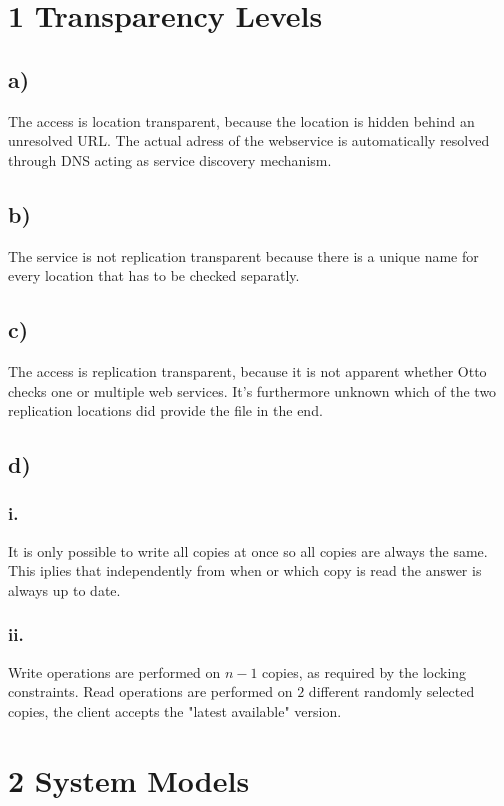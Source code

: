 \documentclass{scrartcl}
\author{Felix Bühler\\2973410 \and Clemens Lieb\\3130838 \and Steffen Wonner\\2862123 \and Fabian Bühler\\2953320}
\title{\gettitle}
\subtitle{\getsubtitle}
\begin{document}
\maketitle

\section*{1 Transparency Levels}
\subsection*{a)}
The access is location transparent, because the location is hidden behind an unresolved URL.
The actual adress of the webservice is automatically resolved through DNS acting as service discovery mechanism.
\subsection*{b)}
The service is not replication transparent because there is a unique name for every location that has to be checked separatly.
\subsection*{c)}
The access is replication transparent, because it is not apparent whether Otto checks one or multiple web services.
It's furthermore unknown which of the two replication locations did provide the file in the end.
\subsection*{d)}
\subsubsection*{i.}
It is only possible to write all copies at once so all copies are always the same.
This iplies that independently from when or which copy is read the answer is always up to date.
\subsubsection*{ii.}
Write operations are performed on \(n-1\) copies, as required by the locking constraints.
Read operations are performed on \(2\) different randomly selected copies, the client accepts the "latest available" version.

\section*{2 System Models}
\end{document}
